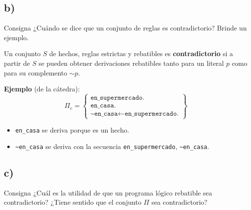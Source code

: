 \documentclass[11pt,a4paper]{article}
\newcommand{\nf}{\textasciitilde}                 %
\newcommand{\est}{\leftarrow}                      %
\begin{document}
\subsection{b)}

\begin{enunciado}{Consigna}
¿Cuándo se dice que un conjunto de reglas es contradictorio? Brinde un ejemplo.
\end{enunciado}

Un conjunto $S$ de hechos, reglas estrictas y rebatibles es \textbf{contradictorio} si a partir de $S$ se pueden obtener derivaciones rebatibles tanto para un literal $p$ como para su complemento ${\sim}p$.

\textbf{Ejemplo} (de la cátedra):
\[
\Pi_c = \left\{\begin{array}{l}
\texttt{en\_supermercado.} \\
\texttt{en\_casa.} \\
\texttt{\nf en\_casa} \est \texttt{en\_supermercado.}
\end{array}\right\}
\]
\begin{itemize}
  \item \texttt{en\_casa} se deriva porque es un hecho.
  \item \texttt{\nf en\_casa} se deriva con la secuencia \texttt{en\_supermercado}, \texttt{\nf en\_casa}.
\end{itemize}

\begin{center}
\end{center}

\subsection{c)}

\begin{enunciado}{Consigna}
¿Cuál es la utilidad de que un programa lógico rebatible sea contradictorio? ¿Tiene sentido que el conjunto $\Pi$ sea contradictorio?
\end{enunciado}
\end{document}
